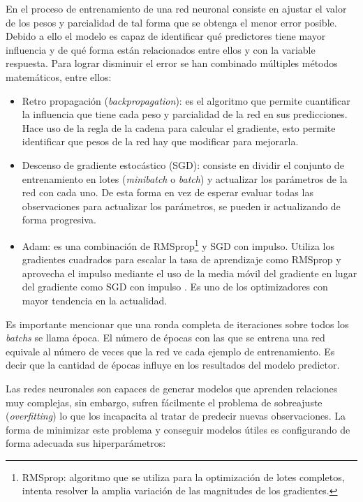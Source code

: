    En el proceso de entrenamiento de una red neuronal consiste en ajustar el valor de los pesos y parcialidad de tal forma que se obtenga el menor error posible. Debido a ello el modelo es capaz de identificar qu\'{e} predictores tiene mayor influencia y de qu\'{e} forma est\'{a}n relacionados entre ellos y con la variable respuesta. Para lograr disminuir el error se han combinado m\'{u}ltiples m\'{e}todos matem\'{a}ticos, entre ellos:
  
  \begin{itemize}
  	\item Retro propagaci\'{o}n (\textit{backpropagation}): es el algoritmo que permite cuantificar la influencia que tiene cada peso y parcialidad de la red en sus predicciones. Hace uso de la regla de la cadena para calcular el gradiente, esto permite identificar que pesos de la red hay que modificar para mejorarla.
  	\item Descenso de gradiente estoc\'{a}stico (SGD): consiste en dividir el conjunto de entrenamiento en lotes (\textit{minibatch} o \textit{batch}) y actualizar los par\'{a}metros de la red con cada uno. De esta forma en vez de esperar evaluar todas las observaciones para actualizar los par\'{a}metros, se pueden ir actualizando de forma progresiva.
  	\item Adam: es una combinaci\'{o}n de RMSprop\footnote{RMSprop: algoritmo que se utiliza para la optimizaci\'{o}n de lotes completos, intenta resolver la amplia variaci\'{o}n de las magnitudes de los gradientes.} y SGD con impulso. Utiliza los gradientes cuadrados para escalar la tasa de aprendizaje como RMSprop y aprovecha el impulso mediante el uso de la media m\'{o}vil del gradiente en lugar del gradiente como SGD con impulso \cite{33}. Es uno de los optimizadores con mayor tendencia en la actualidad.
  \end{itemize}

    Es importante mencionar que una ronda completa de iteraciones sobre todos los \textit{batchs} se llama \'{e}poca. El n\'{u}mero de \'{e}pocas con las que se entrena una red equivale al n\'{u}mero de veces que la red ve cada ejemplo de entrenamiento. Es decir que la cantidad de \'{e}pocas influye en los resultados del modelo predictor.
    
    Las redes neuronales son capaces de generar modelos que aprenden relaciones muy complejas, sin embargo, sufren f\'{a}cilmente el problema de sobreajuste (\textit{overfitting}) lo que los incapacita al tratar de predecir nuevas observaciones. La forma de minimizar este problema y conseguir modelos \'{u}tiles es configurando de forma adecuada sus hiperpar\'{a}metros:
    
